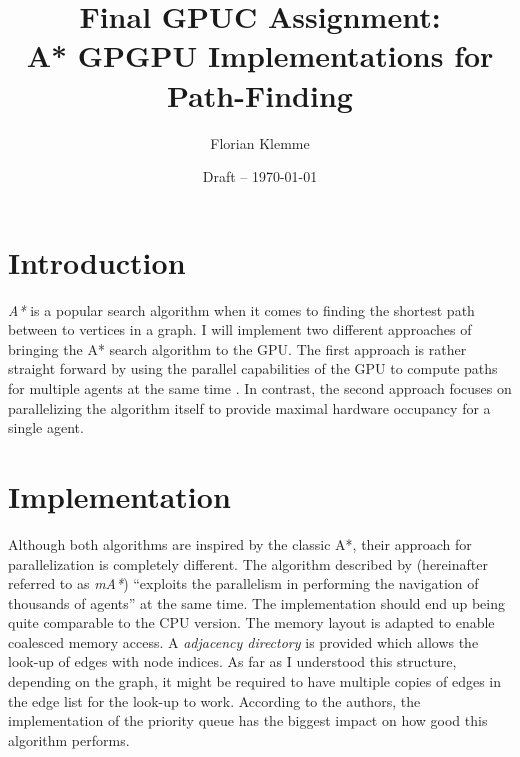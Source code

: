 \documentclass[
    paper = a4,
    twocolumn = true,
    DIV = calc
]{scrartcl}
\newcommand{\mA}{mA*}
\begin{document}
\title{Final GPUC Assignment:\\
       A* GPGPU Implementations for Path-Finding}
\author{Florian Klemme}
\date{Draft -- \today}
\maketitle


\section{Introduction}


\emph{A*} is a popular search algorithm when it comes to finding the shortest path between to vertices in a graph. I will implement two different approaches of bringing the A* search algorithm to the GPU. The first approach is rather straight forward by using the parallel capabilities of the GPU to compute paths for multiple agents at the same time \cite{silva2011gpu}. In contrast, the second approach focuses on parallelizing the algorithm itself to provide maximal hardware occupancy for a single agent. \cite{zhou2015massively}


\section{Implementation}


Although both algorithms are inspired by the classic A*, their approach for parallelization is completely different. The algorithm described by \cite{silva2011gpu} (hereinafter referred to as \emph{\mA{}}) ``exploits the parallelism in performing the navigation of thousands of agents'' at the same time. The implementation should end up being quite comparable to the CPU version. The memory layout is adapted to enable coalesced memory access. A \emph{adjacency directory} is provided which allows the look-up of edges with node indices. As far as I understood this structure, depending on the graph, it might be required to have multiple copies of edges in the edge list for the look-up to work. According to the authors, the implementation of the priority queue has the biggest impact on how good this algorithm performs.
\end{document}
